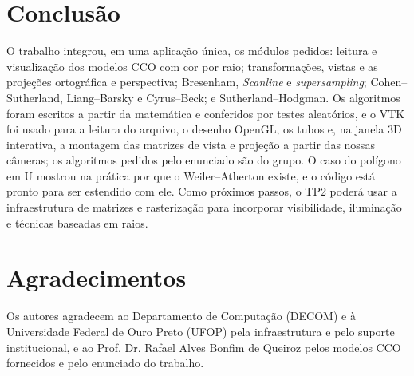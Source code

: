 \documentclass[11pt, a4paper]{article}
\begin{document}
\section{Conclusão}
O trabalho integrou, em uma aplicação única, os módulos pedidos: leitura e
visualização dos modelos CCO com cor por raio; transformações, vistas e as projeções ortográfica e
perspectiva; Bresenham, \emph{Scanline} e \emph{supersampling}; Cohen--Sutherland,
Liang--Barsky e Cyrus--Beck; e Sutherland--Hodgman. Os algoritmos foram escritos
a partir da matemática e conferidos por testes aleatórios, e o VTK foi usado para a leitura do arquivo, o desenho OpenGL, os tubos e,
na janela 3D interativa, a montagem das matrizes de vista e projeção a partir
das nossas câmeras; os algoritmos pedidos pelo enunciado são do grupo. O caso do
polígono em U mostrou na prática por que o Weiler--Atherton existe, e o código está
pronto para ser estendido com ele. Como próximos passos, o TP2 poderá usar a infraestrutura de
matrizes e rasterização para incorporar visibilidade, iluminação e técnicas baseadas
em raios.


\section*{Agradecimentos}
Os autores agradecem ao Departamento de Computação (DECOM) e à Universidade Federal de Ouro Preto (UFOP) pela infraestrutura e pelo suporte institucional, e ao Prof. Dr. Rafael Alves Bonfim de Queiroz pelos modelos CCO fornecidos e pelo enunciado do trabalho.
\end{document}
